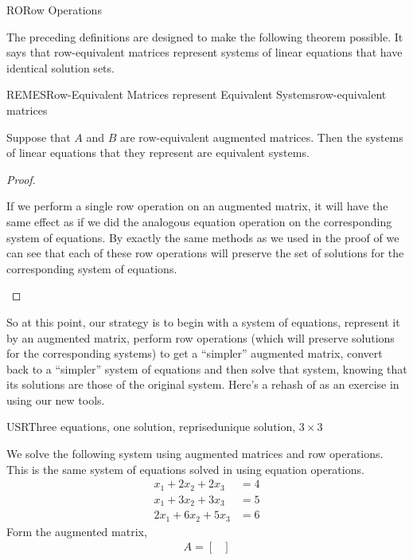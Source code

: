 \begin{subsect}{RO}{Row Operations}
%
\begin{para}The preceding definitions are designed to make the following theorem possible.  It says that row-equivalent matrices represent systems of linear equations that have identical solution sets.\end{para}
%
\begin{theorem}{REMES}{Row-Equivalent Matrices represent Equivalent Systems}{row-equivalent matrices}
\begin{para}Suppose that $A$ and $B$ are row-equivalent augmented matrices.  Then the systems of linear equations that they represent are equivalent systems.\end{para}
\end{theorem}
%
\begin{proof}
\begin{para}If we perform a single row operation on an augmented matrix, it will have the same effect as if we did the analogous equation operation on the corresponding system of equations.  By exactly the same methods as we used in the proof of  we can see that each of these row operations will preserve the set of solutions for the corresponding system of equations.\end{para}
\end{proof}
%
\begin{para}So at this point, our strategy is to begin with a system of equations, represent it by an augmented matrix, perform row operations (which will preserve solutions for the corresponding systems) to get a ``simpler'' augmented matrix, convert back to a ``simpler''  system of equations and then solve that system, knowing that its solutions are those of the original system.  Here's a rehash of  as an exercise in using our new tools.\end{para}
%
\begin{example}{USR}{Three equations, one solution, reprised}{unique solution, $3\times 3$}
\begin{para}We solve the following system using augmented matrices and row operations.  This is the same system of equations solved in  using equation operations.
\begin{align*}
x_1+2x_2+2x_3&=4\\
x_1+3x_2+3x_3&=5\\
2x_1+6x_2+5x_3&=6
\end{align*}
Form the augmented matrix,
\begin{align*}
A=\begin{bmatrix}

\end{bmatrix}
\end{align*}
\end{para}
\end{example}
\end{subsect}
